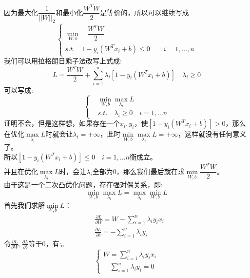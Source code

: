 \documentclass[withoutpreface,bwprint]{cumcmthesis} %
\begin{document}
	因为最大化$\dfrac{1}{||W||_2}$和最小化$\dfrac{W^TW}{2}$是等价的，所以可以继续写成
	\begin{equation}
	\begin{cases}
		\mathop{min} \limits_{W,b} \quad \dfrac{W^TW}{2}  \\
		s.t. \quad 1-y_i\left( W^Tx_i+b \right) \leq 0  \quad \quad i=1,\ldots,n   \label{con:ff}
	\end{cases}
	\end{equation}
	我们可以用拉格朗日乘子法改写上式成:
	\begin{equation}
		L=\dfrac{W^TW}{2}+\sum_{i=1}^{n} \lambda_i \left[  1-y_i\left( W^Tx_i+b \right) \right] \quad \lambda_i \geq 0
	\end{equation}
	可以写成:
	\begin{equation}
		\begin{cases}
		 &\mathop{min} \limits_{W,b} \mathop{max} \limits_{\lambda_i} L
		\\ &s.t. \quad \lambda_i \geq 0 \quad i=1,\ldots n
		\end{cases} 
		\label{con:H}
	\end{equation}
	证明不会，但是这样想，如果存在一个$x_i,y_i$，使$\left[  1-y_i\left( W^Tx_i+b \right) \right] >0$，那么在优化$\mathop{max} \limits_{\lambda_i} L$时就会让$\lambda_i=+\infty$，此时$\mathop{min} \limits_{W,b} \mathop{max} \limits_{\lambda_i} L=+\infty$，这样就没有任何意义了。\\
	所以$\left[  1-y_i\left( W^Tx_i+b \right) \right] \leq 0 \quad i=1,\ldots n$衡成立。\\
	并且在优化$\mathop{max} \limits_{\lambda_i} L$时，会让$\lambda_i$全部为0，那么我们最后就在求$\mathop{min} \limits_{W,b} \dfrac{W^TW}{2} $。\\
	由于这是一个二次凸优化问题，存在强对偶关系，即:
	\begin{equation}
		\mathop{min} \limits_{W,b} \mathop{max} \limits_{\lambda_i} L=\mathop{max} \limits_{\lambda_i} \mathop{min} \limits_{W,b} L
	\end{equation}
	首先我们求解$\mathop{min} \limits_{W,b} L$：
	\begin{align*}
			& \frac{\partial L}{\partial W}=W-\sum_{i=1}^{n}\lambda_i y_i x_i \\
			& \frac{\partial L}{\partial b}=-\sum_{i=1}^{n} \lambda_i y_i
	\end{align*}
	令$\frac{\partial L}{\partial W},\frac{\partial L}{\partial b}$等于$0$，有:。
	\begin{equation}
		\begin{cases}
			W=\sum_{i=1}^{n}\lambda_i y_i x_i \\
			\quad	\sum_{i=1}^{n}\lambda_i y_i=0
		\end{cases}
	\label{con:wb}
	\end{equation}
\end{document}
